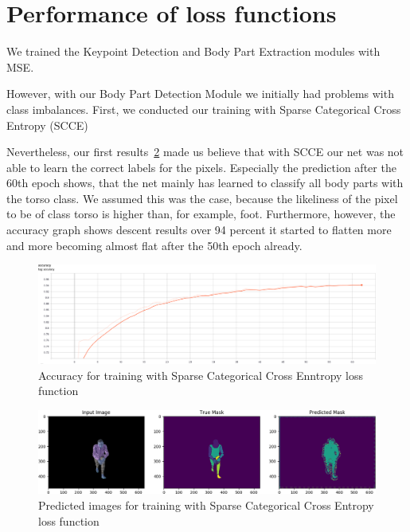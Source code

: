 

\section{Performance of loss functions}

We trained the Keypoint Detection and Body Part Extraction modules with MSE.

However, with our Body Part Detection Module we initially had problems with class imbalances.
First, we conducted our training with Sparse Categorical Cross Entropy (SCCE)


Nevertheless, our first results~\ref{fig:cross_entropy_pred_img} made us believe that with SCCE our net was not able to
learn the correct labels for the pixels.
Especially the prediction after the 60th epoch shows, that the net mainly has learned to classify all body parts with the
torso class.
We assumed this was the case, because the likeliness of the pixel to be of class torso is higher than, for
example, foot.
Furthermore, however, the accuracy graph shows descent results over 94 percent it started to flatten more and more becoming
almost flat after the 50th epoch already.
\begin{figure}[H]
    \centering
    \includegraphics[width=\textwidth,height=\textheight,keepaspectratio]{Figures/accuracy_cross_entropy.png}
    \decoRule
    \caption[Loss Functions SCCE: Accuracy]{Accuracy for training with Sparse Categorical Cross Enntropy loss function}
    \label{fig:accuracy_cross_entropy}
\end{figure}
\begin{figure}[H]
    \centering
    \includegraphics[width=\textwidth,height=\textheight,keepaspectratio]{Figures/crossentropy_imgs_prediction_last_epoch.png}
    \decoRule
    \caption[Loss Functions SCCE: predictions]{Predicted images for training with Sparse Categorical Cross Entropy loss function}
    \label{fig:cross_entropy_pred_img}
\end{figure}
